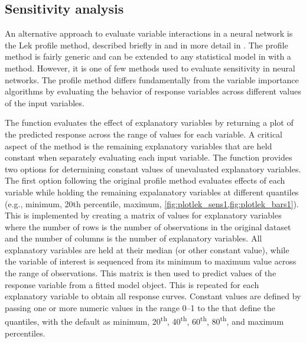 \documentclass[article,shortnames]{jss}\usepackage[]{graphicx}\usepackage[]{color}
\begin{document}
\subsection{Sensitivity analysis}

An alternative approach to evaluate variable interactions in a neural network is the Lek profile method, described briefly in \citet{Lek96} and in more detail in \citet{Gevrey03}. The profile method is fairly generic and can be extended to any statistical model in  with a  method. However, it is one of few methods used to evaluate sensitivity in neural networks.  The profile method differs fundamentally from the variable importance algorithms by evaluating the behavior of response variables across different values of the input variables.  

The  function evaluates the effect of explanatory variables by returning a plot of the predicted response across the range of values for each variable.  A critical aspect of the method is the remaining explanatory variables that are held constant when separately evaluating each input variable.  The  function provides two options for determining constant values of unevaluated explanatory variables.  The first option following the original profile method evaluates effects of each variable while holding the remaining expalanatory variables at different quantiles (e.g., minimum, 20th percentile, maximum, \cref{fig:plotlek_sens1,fig:plotlek_bars1}). This is implemented by creating a matrix of values for explanatory variables where the number of rows is the number of observations in the original dataset and the number of columns is the number of explanatory variables. All explanatory variables are held at their median (or other constant value), while the variable of interest is sequenced from its minimum to maximum value across the range of observations. This matrix is then used to predict values of the response variable from a fitted model object. This is repeated for each explanatory variable to obtain all response curves.  Constant values are defined by passing one or more numeric values in the range 0--1 to the  that define the quantiles, with the default as minimum, 20\textsuperscript{th}, 40\textsuperscript{th}, 60\textsuperscript{th}, 80\textsuperscript{th}, and maximum percentiles.  
\end{document}
